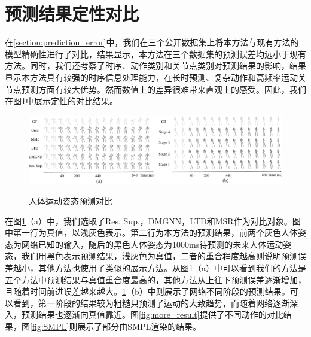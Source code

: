 \section{预测结果定性对比}
在\ref{section:prediction_error}中，我们在三个公开数据集上将本方法与现有方法的模型精确性进行了对比，结果显示，本方法在三个数据集的预测误差均远小于现有方法。同时，我们还考察了时序、动作类别和关节点类别对预测结果的影响，结果显示本方法具有较强的时序信息处理能力，在长时预测、复杂动作和高频率运动关节点预测方面有较大优势。然而数值上的差异很难带来直观上的感受。因此，我们在图\ref{fig:prediction_result}中展示定性的对比结果。

\begin{figure}[ht]
    \centering
    \includegraphics[width=1\textwidth]{FigMa/prediction_result.pdf}\\
    \vspace{-0.3cm}
    \caption{人体运动姿态预测对比}
    \label{fig:prediction_result}
\end{figure}

在图\ref{fig:prediction_result}（a）中，我们选取了Res. Sup.，DMGNN，LTD和MSR作为对比对象。图中第一行为真值，以浅灰色表示。第二行为本方法的预测结果，前两个灰色人体姿态为网络已知的输入，随后的黑色人体姿态为1000ms待预测的未来人体运动姿态，我们用黑色表示预测结果，浅灰色为真值，二者的重合程度越高则说明预测误差越小，其他方法也使用了类似的展示方法。从图\ref{fig:prediction_result}（a）中可以看到我们的方法是五个方法中预测结果与真值重合度最高的，其他方法从上往下预测误差逐渐增加，且随着时间前进误差越来越大。\ref{fig:prediction_result}（b）中则展示了网络不同阶段的预测结果。可以看到，第一阶段的结果较为粗糙只预测了运动的大致趋势，而随着网络逐渐深入，预测结果也逐渐向真值靠近。图\ref{fig:more_result}提供了不同动作的对比结果，图\ref{fig:SMPL}则展示了部分由SMPL\parencite{loper2015smpl}渲染的结果。


